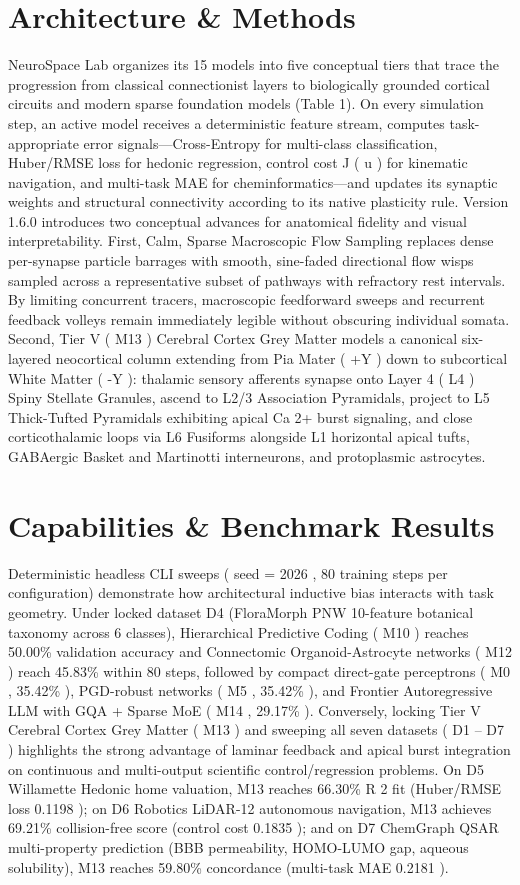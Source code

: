 \documentclass[10pt,letterpaper]{article}
\begin{document}
\section{Architecture \& Methods}
NeuroSpace Lab organizes its 15 models into five conceptual tiers that trace the progression from classical connectionist layers to biologically grounded cortical circuits and modern sparse foundation models (Table 1). On every simulation step, an active model receives a deterministic feature stream, computes task-appropriate error signals---Cross-Entropy for multi-class classification, Huber/RMSE loss for hedonic regression, control cost J ( u ) for kinematic navigation, and multi-task MAE for cheminformatics---and updates its synaptic weights and structural connectivity according to its native plasticity rule. Version 1.6.0 introduces two conceptual advances for anatomical fidelity and visual interpretability. First, Calm, Sparse Macroscopic Flow Sampling replaces dense per-synapse particle barrages with smooth, sine-faded directional flow wisps sampled across a representative subset of pathways with refractory rest intervals. By limiting concurrent tracers, macroscopic feedforward sweeps and recurrent feedback volleys remain immediately legible without obscuring individual somata. Second, Tier V ( M13 ) Cerebral Cortex Grey Matter models a canonical six-layered neocortical column extending from Pia Mater ( +Y ) down to subcortical White Matter ( -Y ): thalamic sensory afferents synapse onto Layer 4 ( L4 ) Spiny Stellate Granules, ascend to L2/3 Association Pyramidals, project to L5 Thick-Tufted Pyramidals exhibiting apical Ca 2+ burst signaling, and close corticothalamic loops via L6 Fusiforms alongside L1 horizontal apical tufts, GABAergic Basket and Martinotti interneurons, and protoplasmic astrocytes.

\section{Capabilities \& Benchmark Results}
Deterministic headless CLI sweeps ( seed = 2026 , 80 training steps per configuration) demonstrate how architectural inductive bias interacts with task geometry. Under locked dataset D4 (FloraMorph PNW 10-feature botanical taxonomy across 6 classes), Hierarchical Predictive Coding ( M10 ) reaches 50.00\% validation accuracy and Connectomic Organoid-Astrocyte networks ( M12 ) reach 45.83\% within 80 steps, followed by compact direct-gate perceptrons ( M0 , 35.42\% ), PGD-robust networks ( M5 , 35.42\% ), and Frontier Autoregressive LLM with GQA + Sparse MoE ( M14 , 29.17\% ). Conversely, locking Tier V Cerebral Cortex Grey Matter ( M13 ) and sweeping all seven datasets ( D1 -- D7 ) highlights the strong advantage of laminar feedback and apical burst integration on continuous and multi-output scientific control/regression problems. On D5 Willamette Hedonic home valuation, M13 reaches 66.30\% R 2 fit (Huber/RMSE loss 0.1198 ); on D6 Robotics LiDAR-12 autonomous navigation, M13 achieves 69.21\% collision-free score (control cost 0.1835 ); and on D7 ChemGraph QSAR multi-property prediction (BBB permeability, HOMO-LUMO gap, aqueous solubility), M13 reaches 59.80\% concordance (multi-task MAE 0.2181 ).
\end{document}
